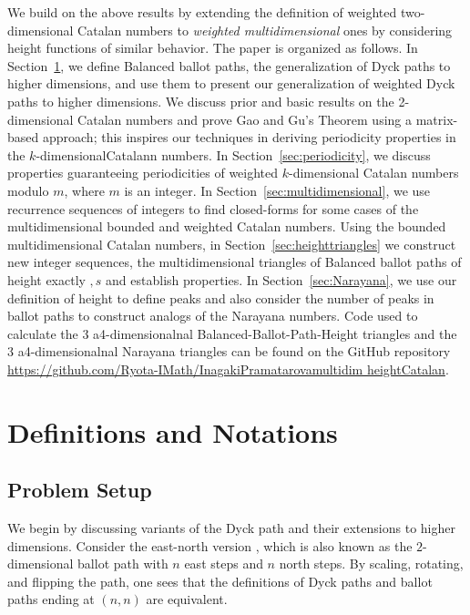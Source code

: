 \documentclass[12pt,notitlepage]{amsart}
\numberwithin{equation}{section}
\theoremstyle{thmstyleone}%
\theoremstyle{thmstyletwo}%
\theoremstyle{thmstylethree}%
\numberwithin{theorem}{section}
\numberwithin{equation}{section}
\begin{document}
We build on the above results by extending the definition of weighted two-dimensional Catalan numbers to \textit{weighted multidimensional} ones by considering height functions of similar behavior. The paper is organized as follows. In Section~\ref{section:preliminaries}, we define Balanced ballot paths, the generalization of Dyck paths to higher dimensions, and use them to present our generalization of weighted Dyck paths to higher dimensions. We discuss prior and basic results on the 2-dimensional Catalan numbers and prove Gao and Gu’s Theorem \cite{gaogu} using a matrix-based approach; this inspires our techniques in deriving periodicity properties in the $k$-dimensionalCatalann numbers. In Section~\ref{sec:periodicity}, we discuss properties guaranteeing periodicities of weighted $k$-dimensional Catalan numbers modulo $m$, where $m$ is an integer. In Section~\ref{sec:multidimensional}, we use recurrence sequences of integers to find closed-forms for some cases of the multidimensional bounded and weighted Catalan numbers. Using the bounded multidimensional Catalan numbers, in Section~\ref{sec:heighttriangles} we construct new integer sequences, the multidimensional triangles of Balanced ballot paths of height exactly $,s$ and establish properties. In Section~\ref{sec:Narayana}, we use our definition of height to define peaks and also consider the number of peaks in ballot paths to construct analogs of the Narayana numbers. Code used to calculate the 3 a4-dimensionalnal Balanced-Ballot-Path-Height triangles and the 3 a4-dimensionalnal Narayana triangles can be found on the GitHub repository \href{https://github.com/Ryota-IMath/Inagaki_Pramatarova_multidim_height_Catalan}{https://github.com/Ryota-IMath/Inagaki\textunderscore Pramatarova\textunderscore multidim \textunderscore height\textunderscore Catalan}.

\section{Definitions and Notations}
\label{section:preliminaries}

\subsection{Problem Setup}
 
We begin by discussing variants of the Dyck path and their extensions to higher dimensions. Consider the east-north version \cite{StanleyCatalan}, which is also known as the $2$-dimensional ballot path with $n$ east steps and $n$ north steps. By scaling, rotating, and flipping the path, one sees that the definitions of Dyck paths and ballot paths ending at $(n,n)$ are equivalent. 
\end{document}
